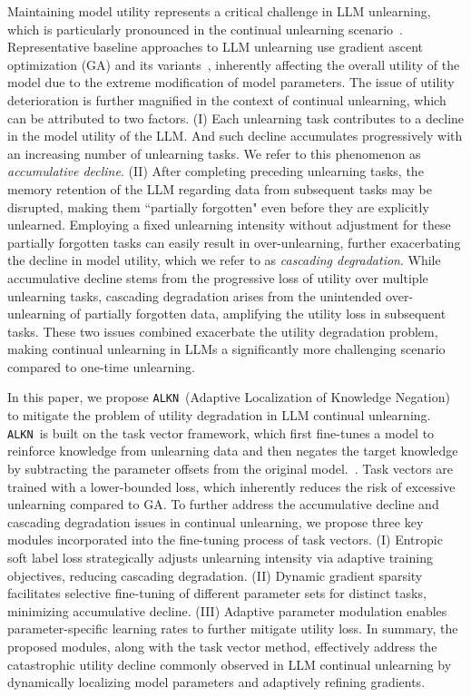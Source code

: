\documentclass{article}
\theoremstyle{plain}
\theoremstyle{definition}
\theoremstyle{remark}
\newcommand{\method}{\texttt{ALKN}}
\begin{document}
Maintaining model utility represents a critical challenge in LLM unlearning, which is particularly pronounced in the continual unlearning scenario~\cite{DBLP:journals/corr/abs-2407-06460}.
Representative baseline approaches to LLM unlearning use gradient ascent optimization (GA) and its variants~\cite{DBLP:conf/icml/00030YYXTS20, DBLP:journals/corr/abs-2310-10683}, inherently affecting the overall utility of the model due to the extreme modification of model parameters.
The issue of utility deterioration is further magnified in the context of continual unlearning, which can be attributed to two factors.
(I) 
Each unlearning task contributes to a decline in the model utility of the LLM.
And such decline accumulates progressively with an increasing number of unlearning tasks.
We refer to this phenomenon as \textit{accumulative decline}.
(II)
After completing preceding unlearning tasks, the memory retention of the LLM regarding data from subsequent tasks may be disrupted, making them ``partially forgotten" even before they are explicitly unlearned.
Employing a fixed unlearning intensity without adjustment for these partially forgotten tasks can easily result in over-unlearning, further exacerbating the decline in model utility, which we refer to as \textit{cascading degradation}.
While accumulative decline stems from the progressive loss of utility over multiple unlearning tasks, cascading degradation arises from the unintended over-unlearning of partially forgotten data, amplifying the utility loss in subsequent tasks.
These two issues combined exacerbate the utility degradation problem, making continual unlearning in LLMs a significantly more challenging scenario compared to one-time unlearning.



In this paper, we propose \method~(Adaptive Localization of Knowledge Negation) to mitigate the problem of utility degradation in LLM continual unlearning.
\method~is built on the task vector framework, which first fine-tunes a model to reinforce knowledge from unlearning data and then negates the target knowledge by subtracting the parameter offsets from the original model.~\cite{DBLP:conf/iclr/IlharcoRWSHF23}.
Task vectors are trained with a lower-bounded loss, which inherently reduces the risk of excessive unlearning compared to GA.
To further address the accumulative decline and cascading degradation issues in continual unlearning, we propose three key modules incorporated into the fine-tuning process of task vectors.
(I) Entropic soft label loss strategically adjusts unlearning intensity via adaptive training objectives, reducing cascading degradation.
(II) Dynamic gradient sparsity facilitates  selective fine-tuning of  different parameter sets for distinct tasks, minimizing accumulative decline.
(III) Adaptive parameter modulation enables parameter-specific learning rates to further mitigate utility loss.
In summary, the proposed modules, along with the task vector method, effectively address the catastrophic utility decline commonly observed in LLM continual unlearning by dynamically localizing model parameters and adaptively refining gradients.
\end{document}
